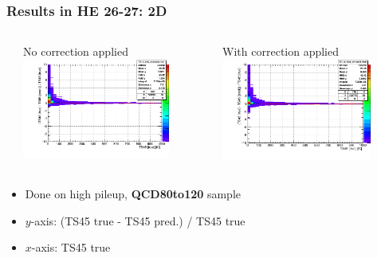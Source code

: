 \documentclass[bigger]{beamer}
\providecommand{\alert}[1]{\textbf{#1}}
\begin{document}
\begin{frame}
\frametitle{Results in HE 26-27: 2D}
\label{sec-3-3-17}
\begin{columns} %
\label{sec-3-3-17-1}
\begin{column}{0.55\textwidth}
\label{sec-3-3-17-1-1}

\centering
No correction applied
\includegraphics[width=0.8\textwidth]{fig/delta_uncorrected_QCD80to120_ring_4.png}
\end{column}
\begin{column}{0.55\textwidth}
\label{sec-3-3-17-1-2}

\centering
With correction applied
\includegraphics[width=0.8\textwidth]{fig/delta_corrected_QCD80to120_ring_4.png}
\end{column}
\end{columns}
\label{sec-3-3-17-2}
\begin{itemize}

\item Done on high pileup, \alert{QCD80to120} sample
\label{sec-3-3-17-2-1}%

\item $y$-axis: (TS45 true - TS45 pred.) / TS45 true
\label{sec-3-3-17-2-2}%

\item $x$-axis: TS45 true
\label{sec-3-3-17-2-3}%

\end{itemize} %
\end{frame}
\end{document}
